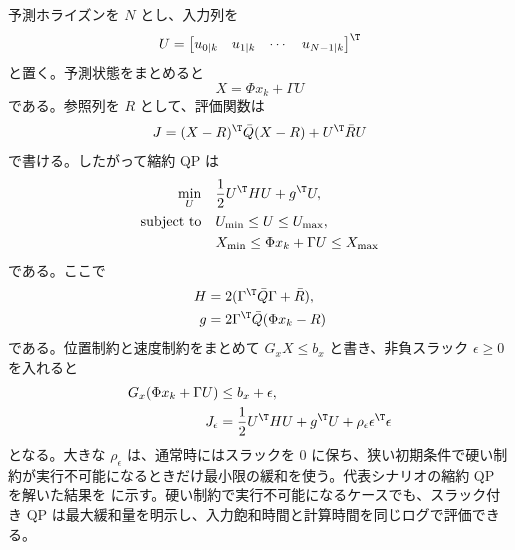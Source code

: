 予測ホライズンを $N$ とし、入力列を
\begin{equation}
  U=
  \begin{bmatrix}
    u_{0|k}&u_{1|k}&\cdots&u_{N-1|k}
  \end{bmatrix}^\T
\end{equation}
と置く。予測状態をまとめると
\begin{equation}
  X=\Phi x_k+\Gamma U
\end{equation}
である。参照列を $R$ として、評価関数は
\begin{equation}
  J=(X-R)^\T\bar{Q}(X-R)+U^\T\bar{R}U
\end{equation}
で書ける。したがって縮約 QP は
\begin{align}
  \min_U\quad&
  \frac{1}{2}U^\T HU+g^\T U,\\
  \text{subject to}\quad&
  U_{\min}\le U\le U_{\max},\\
  &X_{\min}\le \Phi x_k+\Gamma U\le X_{\max}
\end{align}
である。ここで
\begin{align}
  H&=2(\Gamma^\T\bar{Q}\Gamma+\bar{R}),\\
  g&=2\Gamma^\T\bar{Q}(\Phi x_k-R)
\end{align}
である。位置制約と速度制約をまとめて $G_xX\le b_x$ と書き、非負スラック $\epsilon\ge0$ を入れると
\begin{align}
  G_x(\Phi x_k+\Gamma U)&\le b_x+\epsilon,\\
  J_\epsilon&=
  \frac{1}{2}U^\T HU+g^\T U+\rho_\epsilon\epsilon^\T\epsilon
\end{align}
となる。大きな $\rho_\epsilon$ は、通常時にはスラックを 0 に保ち、狭い初期条件で硬い制約が実行不可能になるときだけ最小限の緩和を使う。代表シナリオの縮約 QP を解いた結果を  に示す。硬い制約で実行不可能になるケースでも、スラック付き QP は最大緩和量を明示し、入力飽和時間と計算時間を同じログで評価できる。

